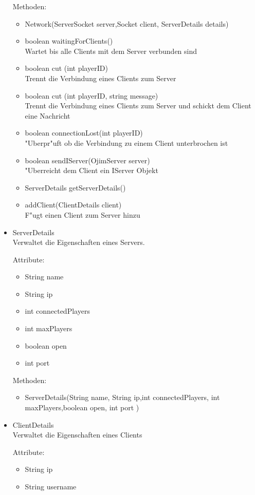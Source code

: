 \documentclass[a4paper,10pt]{article}
\begin{document}
\begin{itemize}
Methoden:
\begin{itemize}
\item Network(ServerSocket server,Socket client, ServerDetails details) 
\item boolean waitingForClients()
\\Wartet bis alle Clients mit dem Server verbunden sind
\item boolean cut (int playerID)
\\Trennt die Verbindung eines Clients zum Server
\item boolean cut (int playerID, string message)
\\Trennt die Verbindung eines Clients zum Server und schickt dem Client eine Nachricht
\item boolean connectionLost(int playerID)
\\"Uberpr"uft ob die Verbindung zu einem Client unterbrochen ist
\item boolean sendIServer(OjimServer server)
\\"Uberreicht dem Client ein IServer Objekt
\item ServerDetails getServerDetails()
\item addClient(ClientDetails client)
\\F"ugt einen Client zum Server hinzu
\end{itemize} %
\item ServerDetails \\
Verwaltet die Eigenschaften eines Servers.

Attribute:
\begin{itemize}
\item String name
\item String ip
\item int connectedPlayers
\item int maxPlayers
\item boolean open
\item int port
\end{itemize}

Methoden:
\begin{itemize}
\item ServerDetails(String name, String ip,int connectedPlayers, int maxPlayers,boolean open, int port ) 
\end{itemize}
\item ClientDetails\\
Verwaltet die Eigenschaften eines Clients

Attribute:
\begin{itemize}
\item String ip
\item String username
\end{itemize}


\end{itemize}
\end{document}
